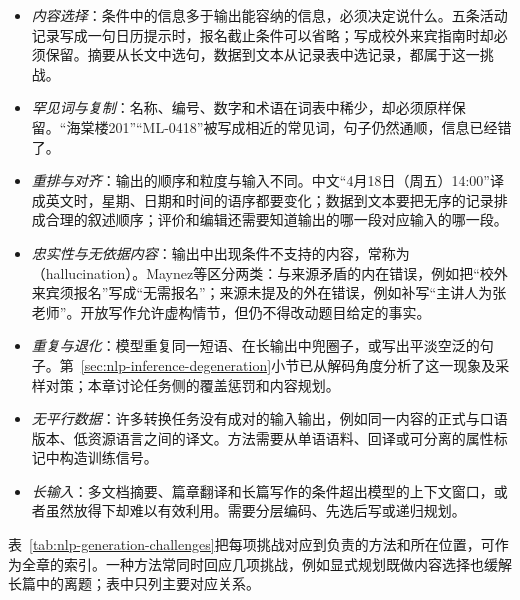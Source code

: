 \begin{itemize}
  \item \emph{内容选择}：条件中的信息多于输出能容纳的信息，必须决定说什么。五条活动记录写成一句日历提示时，报名截止条件可以省略；写成校外来宾指南时却必须保留。摘要从长文中选句，数据到文本从记录表中选记录，都属于这一挑战。
  \item \emph{罕见词与复制}：名称、编号、数字和术语在词表中稀少，却必须原样保留。“海棠楼201”“ML-0418”被写成相近的常见词，句子仍然通顺，信息已经错了。
  \item \emph{重排与对齐}：输出的顺序和粒度与输入不同。中文“4月18日（周五）14:00”译成英文时，星期、日期和时间的语序都要变化；数据到文本要把无序的记录排成合理的叙述顺序；评价和编辑还需要知道输出的哪一段对应输入的哪一段。
  \item \emph{忠实性与无依据内容}：输出中出现条件不支持的内容，常称为（hallucination）。Maynez等区分两类：与来源矛盾的内在错误，例如把“校外来宾须报名”写成“无需报名”；来源未提及的外在错误，例如补写“主讲人为张老师”。开放写作允许虚构情节，但仍不得改动题目给定的事实。
  \item \emph{重复与退化}：模型重复同一短语、在长输出中兜圈子，或写出平淡空泛的句子。第~\ref{sec:nlp-inference-degeneration}小节已从解码角度分析了这一现象及采样对策；本章讨论任务侧的覆盖惩罚和内容规划。
  \item \emph{无平行数据}：许多转换任务没有成对的输入输出，例如同一内容的正式与口语版本、低资源语言之间的译文。方法需要从单语语料、回译或可分离的属性标记中构造训练信号。
  \item \emph{长输入}：多文档摘要、篇章翻译和长篇写作的条件超出模型的上下文窗口，或者虽然放得下却难以有效利用。需要分层编码、先选后写或递归规划。
\end{itemize}

表~\ref{tab:nlp-generation-challenges}把每项挑战对应到负责的方法和所在位置，可作为全章的索引。一种方法常同时回应几项挑战，例如显式规划既做内容选择也缓解长篇中的离题；表中只列主要对应关系。

